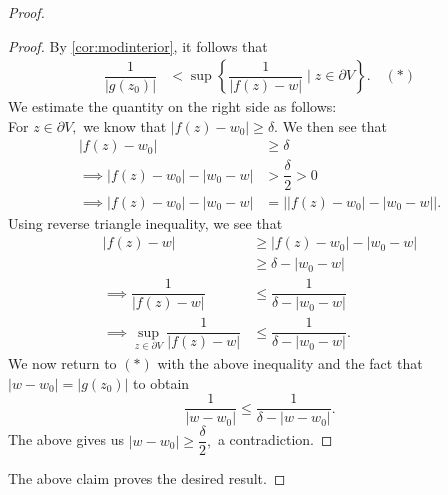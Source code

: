 \begin{proof}
\begin{blockquote}
\begin{proof}
		By \cref{cor:modinterior}, it follows that
		\begin{align*} 
			\dfrac{1}{\left|g(z_0)\right|} &< \sup\left\{\dfrac{1}{\left|f(z) - w\right|} \;\Big|\; z \in \partial V \right\}. \quad (*)
		\end{align*}
		We estimate the quantity on the right side as follows:\\
		For $z \in \partial V,$ we know that $\left|f(z) - w_0\right| \ge \delta.$ We then see that
		\begin{align*} 
			\left|f(z) - w_0\right| &\ge \delta\\
			\implies \left|f(z) - w_0\right| - \left|w_0 - w\right| &> \dfrac{\delta}{2} > 0\\
			\implies \left|f(z) - w_0\right| - \left|w_0 - w\right| &= \left|\left|f(z) - w_0\right| - \left|w_0 - w\right|\right|.
		\end{align*}
		Using reverse triangle inequality, we see that
		\begin{align*} 
			\left|f(z) - w\right| &\ge \left|f(z) - w_0\right| - \left|w_0 - w\right|\\
			&\ge \delta - |w_0 - w|\\
			\implies \dfrac{1}{\left|f(z) - w\right|} &\le \dfrac{1}{\delta - |w_0 - w|}\\
			\implies \sup_{z \in \partial V}\dfrac{1}{\left|f(z) - w\right|} &\le \dfrac{1}{\delta - |w_0 - w|}.
		\end{align*}
		We now return to $(*)$ with the above inequality and the fact that $\left|w - w_0\right| = |g(z_0)|$ to obtain
		\begin{equation*} 
			\dfrac{1}{\left|w - w_0\right|} \le \dfrac{1}{\delta - \left|w - w_0\right|}.
		\end{equation*}
		The above gives us $\left|w - w_0\right| \ge \dfrac{\delta}{2},$ a contradiction.
	\end{proof}
	\end{blockquote}
	The above claim proves the desired result.
\end{proof}